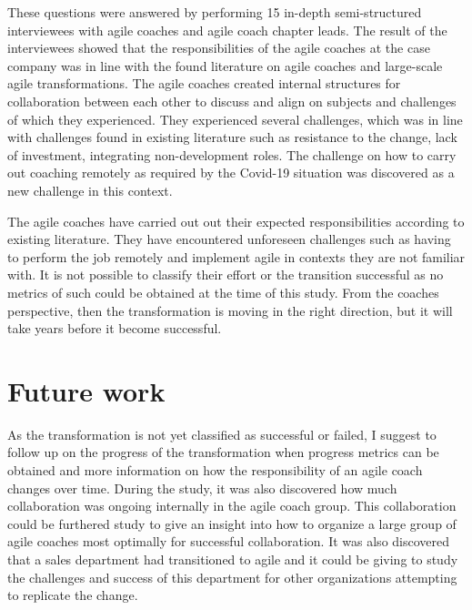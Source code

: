 \documentclass[11pt,a4paper]{report}
\begin{document}
These questions were answered by performing 15 in-depth semi-structured interviewees with agile coaches and agile coach chapter leads. The result of the interviewees showed that the responsibilities of the agile coaches at the case company was in line with the found literature on agile coaches and large-scale agile transformations. The agile coaches created internal structures for collaboration between each other to discuss and align on subjects and challenges of which they experienced. They experienced several challenges, which was in line with challenges found in existing literature such as resistance to the change, lack of investment, integrating non-development roles. The challenge on how to carry out coaching remotely as required by the Covid-19 situation was discovered as a new challenge in this context. 

The agile coaches have carried out out their expected responsibilities according to existing literature. They have encountered unforeseen challenges such as having to perform the job remotely and implement agile in contexts they are not familiar with. It is not possible to classify their effort or the transition successful as no metrics of such could be obtained at the time of this study. From the coaches perspective, then the transformation is moving in the right direction, but it will take years before it become successful.

\chapter{Future work}
As the transformation is not yet classified as successful or failed, I suggest to follow up on the progress of the transformation when progress metrics can be obtained and more information on how the responsibility of an agile coach changes over time. During the study, it was also discovered how much collaboration was ongoing internally in the agile coach group. This collaboration could be furthered study to give an insight into how to organize a large group of agile coaches most optimally for successful collaboration. It was also discovered that a sales department had transitioned to agile and it could be giving to study the challenges and success of this department for other organizations attempting to replicate the change. 

\newpage
\printbibliography
\newpage
\appendix
\end{document}

